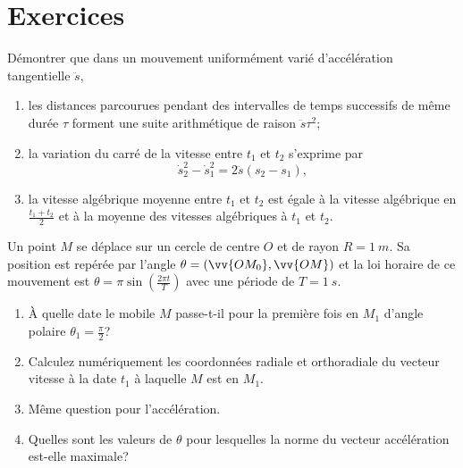 \section{Exercices}%
\label{chap1-sec:exercices}%
\begin{exercice}%
  Démontrer que dans un mouvement uniformément varié d'accélération 
  tangentielle \(\ddot{s}\),
  \begin{enumerate}%
  \item les distances parcourues pendant des intervalles de temps successifs 
  de même durée \(\tau\) forment une suite arithmétique de raison 
  \(\ddot{s}\tau^2\);
  \item la variation du carré de la vitesse entre \(t_1\) et \(t_2\) s'exprime 
    par
    \begin{equation}%
      \dot{s}_2^2-\dot{s}_1^2 = 2 \ddot{s}(s_2-s_1),%
    \end{equation}%
  \item la vitesse algébrique moyenne entre \(t_1\) et \(t_2\) est égale à la 
    vitesse algébrique en \(\frac{t_1+t_2}{2}\) et à la moyenne des vitesses 
    algébriques à \(t_1\) et \(t_2\).
  \end{enumerate}%
\end{exercice}%
%
\begin{exercice}%
  Un point \(M\) se déplace sur un cercle de centre \(O\) et de rayon 
  \(R=\SI{1}{m}\). Sa position est repérée par l'angle 
  \(\theta=(\vv{OM_0},\vv{OM})\) et la loi horaire de ce mouvement est 
  \(\theta=\pi\sin\left(\frac{2\pi t}{T}\right)\) avec une période de 
  \(T=\SI{1}{s}\).
  \begin{enumerate}%
  \item À quelle date le mobile \(M\) passe-t-il pour la première fois en 
    \(M_1\) d'angle polaire \(\theta_1=\frac{\pi}{2}\)?
  \item Calculez numériquement les coordonnées radiale et orthoradiale du 
    vecteur vitesse à la date \(t_1\) à laquelle \(M\) est en \(M_1\).
  \item Même question pour l'accélération.
  \item Quelles sont les valeurs de \(\theta\) pour lesquelles la norme du 
    vecteur accélération est-elle maximale?
  \end{enumerate}%
\end{exercice}%
%
